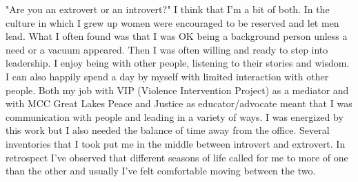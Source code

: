 "Are you an extrovert or an introvert?"
I think that I'm a bit of both.
In the culture in which I grew up women were encouraged to be reserved and let men lead.
What I often found was that I was OK being a background person unless a need or a vacuum appeared.
Then I was often willing and ready to step into leadership.
I enjoy being with other people, listening to their stories and wisdom.
I can also happily spend a day by myself with limited interaction with other people.
Both my job with VIP (Violence Intervention Project) as a mediator and with MCC Great Lakes Peace and Justice as educator/advocate meant that I was communication with people and leading in a variety of ways.
I was energized by this work but I also needed the balance of time away from the office.
Several inventories that I took put me in the middle between introvert and extrovert.
In retrospect I've observed that different seasons of life called for me to more of one than the other and usually I've felt comfortable moving between the two.





